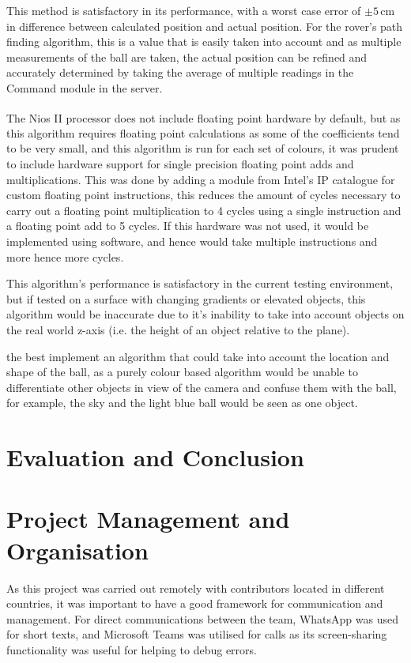 \documentclass[a4paper]{article}
\newcommand{\unit}[1]{\ensuremath{\, \mathrm{#1}}}
\begin{document}
This method is satisfactory in its performance, with a worst case error of \(\pm5\unit{cm}\)
in difference between calculated position and actual position. For the rover's 
path finding algorithm, this is a value that is easily taken into account and as
multiple measurements of the ball are taken, the actual position can be refined 
and accurately determined by taking the average of multiple readings in the 
Command module in the server. 

The Nios\textsuperscript{\textregistered} II processor does not include floating point hardware by default, but as 
this algorithm requires floating point calculations as some of the coefficients 
tend to be very small, and this algorithm is run for each set of colours, it was
prudent to include hardware support for single precision floating point adds 
and multiplications. This was done by adding a module from Intel's IP catalogue 
for custom floating point instructions, this reduces the amount of cycles 
necessary to carry out a floating point multiplication to 4 cycles using a single
instruction and a floating point add to 5 cycles\cite{NiosIICustomInstruction}.
If this hardware was not used, it would be implemented using software, and hence
would take multiple instructions and more hence more cycles. 

This algorithm's performance is satisfactory in the current testing environment, 
but if tested on a surface with changing gradients or elevated objects, this algorithm
would be inaccurate due to it's inability to take into account objects on the real
world z-axis (i.e. the height of an object relative to the plane).  


the best implement an algorithm that could take into account the location 
and shape of the ball, as a purely colour based algorithm would be unable to 
differentiate other objects in view of the camera and confuse them with the ball, 
for example, the sky and the light blue ball would be seen as one object.


\section{Evaluation and Conclusion}

\section{Project Management and Organisation}
As this project was carried out remotely
with contributors located in different countries, 
it was important to have a good framework for communication and management. 
For direct communications between the team, WhatsApp was used for short texts, 
and Microsoft Teams was utilised for calls as its screen-sharing functionality 
was useful for helping to debug errors. 
\end{document}
